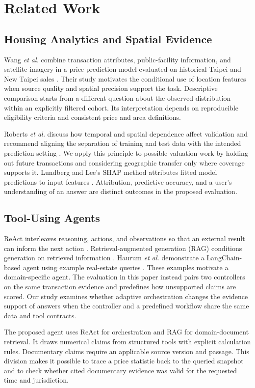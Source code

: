 \section{Related Work}
\label{sec:related}
\subsection{Housing Analytics and Spatial Evidence}
Wang \emph{et al.} combine transaction attributes, public-facility information, and satellite imagery in a price prediction model evaluated on historical Taipei and New Taipei sales \cite{wang}. Their study motivates the conditional use of location features when source quality and spatial precision support the task. Descriptive comparison starts from a different question about the observed distribution within an explicitly filtered cohort. Its interpretation depends on reproducible eligibility criteria and consistent price and area definitions.

Roberts \emph{et al.} discuss how temporal and spatial dependence affect validation and recommend aligning the separation of training and test data with the intended prediction setting \cite{roberts}. We apply this principle to possible valuation work by holding out future transactions and considering geographic transfer only where coverage supports it. Lundberg and Lee's SHAP method attributes fitted model predictions to input features \cite{shap}. Attribution, predictive accuracy, and a user's understanding of an answer are distinct outcomes in the proposed evaluation.

\subsection{Tool-Using Agents}
ReAct interleaves reasoning, actions, and observations so that an external result can inform the next action \cite{react}. Retrieval-augmented generation (RAG) conditions generation on retrieved information \cite{rag}. Haurum \emph{et al.} demonstrate a LangChain-based agent using example real-estate queries \cite{haurum}. These examples motivate a domain-specific agent. The evaluation in this paper instead pairs two controllers on the same transaction evidence and predefines how unsupported claims are scored. Our study examines whether adaptive orchestration changes the evidence support of answers when the controller and a predefined workflow share the same data and tool contracts.

The proposed agent uses ReAct for orchestration and RAG for domain-document retrieval. It draws numerical claims from structured tools with explicit calculation rules. Documentary claims require an applicable source version and passage. This division makes it possible to trace a price statistic back to the queried snapshot and to check whether cited documentary evidence was valid for the requested time and jurisdiction.
